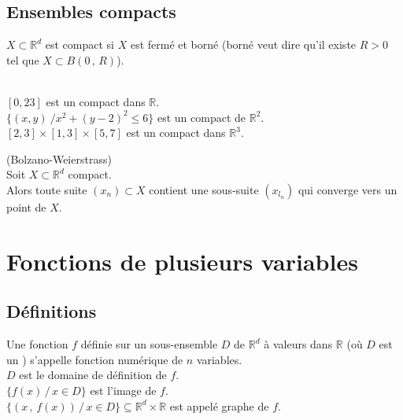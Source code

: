 \documentclass[class=report,crop=false]{standalone}
\begin{document}
\subsection{Ensembles compacts}







\begin{definition}
$X \subset \mathbb{R}^d$ est compact si $X$ est fermé et borné (borné veut dire qu'il existe $R > 0$ tel que $X \subset B(0\,,\,R)$).
\end{definition}


\\
$[0,23]$ est un compact dans $\mathbb{R}$.\\
$\{(x,y)\ / x^2+(y-2)^2\leq 6\}$ est un compact de $\mathbb{R}^2$.\\
$[2,3]\times[1,3]\times[5,7]$ est un compact dans $\mathbb{R}^3$.\\


\begin{theoreme} (Bolzano-Weierstrass)\\
Soit $X \subset \mathbb{R}^d$ compact. \\
Alors toute suite $(x_{n}) \subset X$ contient une sous-suite $(x_{l_n})$ qui converge vers un point de $X$.
\end{theoreme}

\newpage
\section{Fonctions de plusieurs variables}

\subsection{Définitions}


\begin{definition}
Une fonction $f$ définie sur un sous-ensemble $D$ de $\mathbb{R}^d$ \`a valeurs dans $\mathbb{R}$ (o\`u $D$ est un ) s'appelle fonction numérique de $n$ variables.\\
$D$ est le domaine de définition de $f$.\\
$\lbrace f(x)\,/\, x \in D \rbrace$ est l'image de $f$.\\
$\lbrace (x\,,\,f(x))\,/\, x \in D \rbrace \subseteq \mathbb{R}^d \times \mathbb{R}$ est appelé graphe de $f$.\\
\end{definition}
\end{document}
